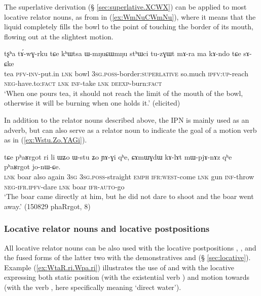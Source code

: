 The superlative derivation (§ \ref{sec:superlative.XCWX}) can be applied to most locative relator nouns, as  from   in (\ref{ex:WmNuCWmNu}), where it means that the liquid completely fills the bowl to the point of touching the border of its mouth, flowing out at the slightest motion.

\begin{exe}
\ex \label{ex:WmNuCWmNu}
\gll  tʂʰa tɤ́-wɣ-rku tɕe kʰɯtsa ɯ-mŋuɕɯmŋu stʰɯci tu-zɣɯt mɤ-ra ma kɤ-ndo tɕe sɤ-ɕke \\
tea \textsc{pfv}-\textsc{inv}-put.in \textsc{lnk} bowl \textsc{3sg}.\textsc{poss}-border:\textsc{superlative} so.much \textsc{ipfv}:\textsc{up}-reach \textsc{neg}-have.to:\textsc{fact} \textsc{lnk} \textsc{inf}-take \textsc{lnk} \textsc{deexp}-burn:\textsc{fact} \\
\glt `When one pours tea, it should not reach the limit of the mouth of the bowl, otherwise it will be burning when one holds it.' (elicited)
\end{exe} 

In addition to the relator nouns described above, the IPN  is mainly used as an adverb, but can also serve as a relator noun to indicate the goal of a motion verb as in (\ref{ex:Wstu.Zo.YAGi}).

\begin{exe}
\ex \label{ex:Wstu.Zo.YAGi}
\gll  tɕe pʰaʁrgot ri li ɯʑo ɯ-stu ʑo ɲɤ-ɣi qʰe,  ɕɤmɯɣdɯ kɤ-lɤt mɯ-pjɤ-nɤz qʰe pʰaʁrgot jo-nɯ-ɕe. \\
\textsc{lnk} boar also again \textsc{3sg} \textsc{3sg}.\textsc{poss}-straight \textsc{emph} \textsc{ifr}:\textsc{west}-come \textsc{lnk} gun \textsc{inf}-throw \textsc{neg}-\textsc{ifr}.\textsc{ipfv}-dare \textsc{lnk} boar \textsc{ifr}-\textsc{auto}-go \\
\glt `The boar came directly at him, but he did not dare to shoot and the boar went away.' (150829 phaRrgot, 8)
\end{exe} 
 
 
 
\subsubsection{Locative relator nouns and locative postpositions} \label{sec:relator.postposition.location}
 All locative relator nouns can be also used with the locative postpositions , ,  and the fused forms of the latter two with the demonstratives  and  (§ \ref{sec:locative}). Example (\ref{ex:WtaR.ri.Wpa.ri}) illustrates the use of  and  with the locative  expressing both static position (with the existential verb ) and motion towards (with the verb , here specifically meaning `direct water').

